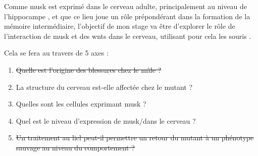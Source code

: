 Comme \gls{musk} est exprimé dans le cerveau adulte, principalement au niveau de l'hippocampe \cite{Garcia-Osta2006}, et que ce lieu joue un rôle prépondérant dans la formation de la mémoire intermédiaire, l'objectif de mon stage va être d'explorer le rôle de l'interaction de \gls{musk} et des \Glspl{wnt} dans le cerveau, utilisant pour cela les souris \mcrd.

Cela se fera au travers de 5 axes : 
\begin{enumerate}
	\item \sout{Quelle est l'origine des blessures chez le mâle ?}
	\item La structure du cerveau est-elle affectée chez le mutant ?
	\item Quelles sont les cellules exprimant \gls{musk} ?
	\item Quel est le niveau d'expression de \gls{musk}/\mcrd dans le cerveau ?
	\item \sout{Un traitement au \gls{licl} peut-il permettre un retour du mutant à un phénotype sauvage au niveau du comportement ?}
\end{enumerate}